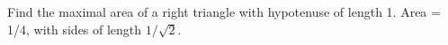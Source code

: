 {Find the maximal area of a right triangle with hypotenuse of length 1. 
}
{Area = 1/4, with sides of length $1/\sqrt{2}$.
}

